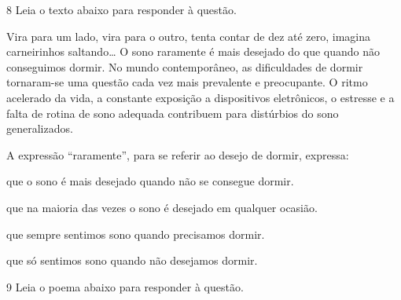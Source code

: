 \num{8} Leia o texto abaixo para responder à questão. 

\begin{myquote}



Vira para um lado, vira para o outro, tenta contar de dez até zero, 
imagina carneirinhos saltando\ldots{} O sono raramente é mais desejado 
do que quando não conseguimos dormir. No mundo contemporâneo, as dificuldades
de dormir tornaram-se uma questão cada vez mais prevalente e preocupante. 
O ritmo acelerado da vida, a constante exposição a dispositivos eletrônicos, 
o estresse e a falta de rotina de sono adequada contribuem para distúrbios do sono
generalizados.




\end{myquote}

A expressão ``raramente'', para se referir ao desejo de dormir, expressa:

\begin{escolha}
  
  \item que o sono é mais desejado quando não se consegue dormir.
  
  \item que na maioria das vezes o sono é desejado em qualquer ocasião.
  
  \item que sempre sentimos sono quando precisamos dormir.
  
  \item que só sentimos sono quando não desejamos dormir. 

\end{escolha}

\num{9} Leia o poema abaixo para responder à questão. 

